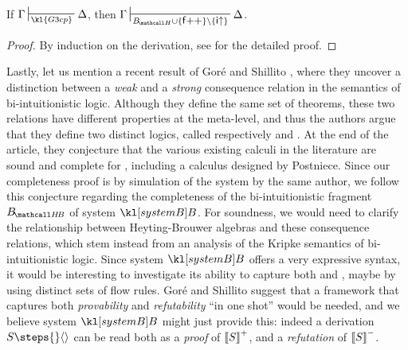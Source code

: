 \begin{lemma}[Simulation of \kl{G3cp}]
  If $\Gamma \prov{\kl{G3cp}} \Delta$, then $\Gamma \prov{\sysBH \cup
  \{\rsf{f{+}{+}}\} \setminus \{\rsf{i{\ua}}\}} \Delta$.
\end{lemma}
\begin{proof}
  By induction on the  derivation, see
   for the detailed proof.
\end{proof}

Lastly, let us mention a recent result of Goré and Shillito
\cite{gore_bi-intuitionistic_2020}, where they uncover a distinction between a
\emph{weak} and a \emph{strong} consequence relation in the semantics of
bi-intuitionistic logic. Although they define the same set of theorems, these
two relations have different properties at the meta-level, and thus the authors
argue that they define two distinct logics, called respectively  and
. At the end of the article, they conjecture that the various existing
calculi in the literature are sound and complete for , including a
calculus designed by Postniece. Since our completeness proof is by simulation of
the system  by the same author, we follow this conjecture regarding
the completeness of the bi-intuitionistic fragment $\sysBHB$ of system $\sysB$.
For soundness, we would need to clarify the relationship between Heyting-Brouwer
algebras and these consequence relations, which stem instead from an analysis of
the Kripke semantics of bi-intuitionistic logic. Since system $\sysB$ offers a
very expressive syntax, it would be interesting to investigate its ability to
capture both  and , maybe by using distinct sets of flow
rules. Goré and Shillito suggest that a framework that captures both
\emph{provability} and \emph{refutability} ``in one shot'' would be needed, and
we believe system $\sysB$ might just provide this: indeed a derivation $S \steps{}
\piq{}$ can be read both as a \emph{proof} of $\left\llbracket S \right\rrbracket^+$, and a
\emph{refutation} of $\left\llbracket S \right\rrbracket^-$.